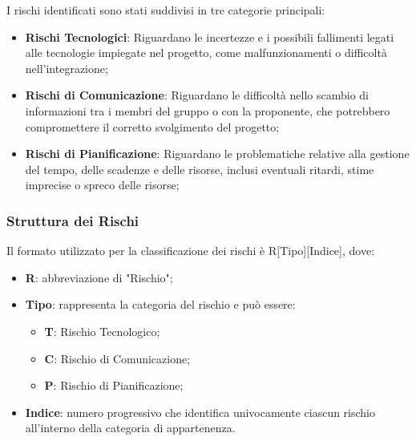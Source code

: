 \documentclass[10pt]{article}
\begin{document}
    I rischi identificati sono stati suddivisi in tre categorie principali:
    \begin{itemize}
        \item \textbf{Rischi Tecnologici}: Riguardano le incertezze e i possibili fallimenti legati alle tecnologie impiegate nel progetto, come malfunzionamenti o difficoltà nell'integrazione; 
        \item \textbf{Rischi di Comunicazione}: Riguardano le difficoltà nello scambio di informazioni tra i membri del gruppo o con la proponente, che potrebbero compromettere il corretto svolgimento del progetto;
        \item \textbf{Rischi di Pianificazione}: Riguardano le problematiche relative alla gestione del tempo, delle scadenze e delle risorse, inclusi eventuali ritardi, stime imprecise o spreco delle risorse;
    \end{itemize}

    \subsubsection{Struttura dei Rischi}
    Il formato utilizzato per la classificazione dei rischi è R[Tipo][Indice], dove:
    \begin{itemize}
        \item \textbf{R}: abbreviazione di "Rischio";
        \item \textbf{Tipo}: rappresenta la categoria del rischio e può essere:
        \begin{itemize}
            \item \textbf{T}: Rischio Tecnologico;
            \item \textbf{C}: Rischio di Comunicazione;
            \item \textbf{P}: Rischio di Pianificazione;
        \end{itemize}
        \item \textbf{Indice}: numero progressivo che identifica univocamente ciascun rischio all'interno della categoria di appartenenza.
    \end{itemize}
\end{document}
